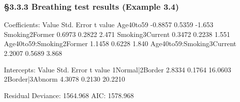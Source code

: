 \documentclass{beamer}
\begin{document}
\begin{frame}[fragile] \frametitle{\S3.3.3 Breathing test results  (Example 3.4)}
\begin{scriptsize}
\begin{Schunk}
\begin{Soutput}
Coefficients:
                            Value Std. Error t value
Age40to59                 -0.8857     0.5359  -1.653
Smoking2Former             0.6973     0.2822   2.471
Smoking3Current            0.3472     0.2238   1.551
Age40to59:Smoking2Former   1.1458     0.6228   1.840
Age40to59:Smoking3Current  2.2007     0.5689   3.868

Intercepts:
                Value   Std. Error t value
1Normal|2Border  2.8334  0.1764    16.0603
2Border|3Abnorm  4.3078  0.2130    20.2210

Residual Deviance: 1564.968 
AIC: 1578.968 
\end{Soutput}
\end{Schunk}
\end{scriptsize}
\end{frame}
\end{document}
